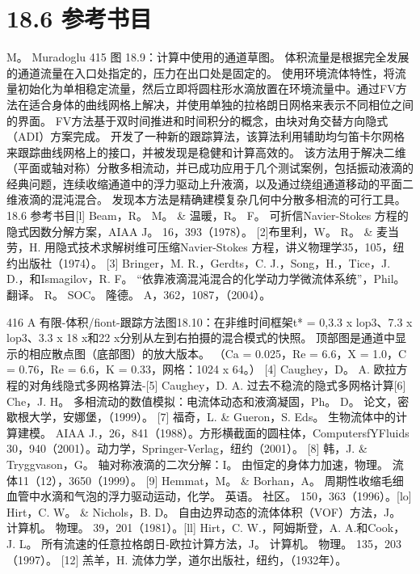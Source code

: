 \documentclass[UTF8,11pt,a4paper,openany,fontset=fandol]{ctexbook}
\begin{document}
\section{18.6 参考书目}
M。 Muradoglu 415 图 18.9：计算中使用的通道草图。 体积流量是根据完全发展的通道流量在入口处指定的，压力在出口处是固定的。 使用环境流体特性，将流量初始化为单相稳定流量，然后立即将圆柱形水滴放置在环境流量中。通过FV方法在适合身体的曲线网格上解决，并使用单独的拉格朗日网格来表示不同相位之间的界面。 FV方法基于双时间推进和时间积分的概念，由块对角交替方向隐式（ADI）方案完成。 开发了一种新的跟踪算法，该算法利用辅助均匀笛卡尔网格来跟踪曲线网格上的接口，并被发现是稳健和计算高效的。 该方法用于解决二维（平面或轴对称）分散多相流动，并已成功应用于几个测试案例，包括振动液滴的经典问题，连续收缩通道中的浮力驱动上升液滴，以及通过绕组通道移动的平面二维液滴的混沌混合。 发现本方法是精确建模复杂几何中分散多相流的可行工具。 18.6 参考书目[l] Beam，R。 M。 \& 温暖，R。 F。 可折信Navier-Stokes 方程的隐式因数分解方案，AIAA J。 16，393（1978）。 [2]布里利，W。 R。 \& 麦当劳，H. 用隐式技术求解树维可压缩Navier-Stokes 方程，讲义物理学35，105，纽约出版社（1974）。 [3] Bringer，M. R.，Gerdts，C. J.，Song，H.，Tice，J. D.，和Ismagilov，R. F。 “依靠液滴混沌混合的化学动力学微流体系统”，Phil。 翻译。 R。 SOC。 隆德。 A，362，1087，（2004）。

416 A 有限-体积/fiont-跟踪方法图18.10：在非维时间框架t* = 0,3.3 x lop3、7.3 x lop3、3.3 x 18 x和22 x分别从左到右拍摄的混合模式的快照。 顶部图是通道中显示的相应散点图（底部图）的放大版本。 （Ca = 0.025，Re = 6.6，X = 1.0，C = 0.76，Re = 6.6，K = 0.33，网格：1024 x 64。） [4] Caughey，D。 A. 欧拉方程的对角线隐式多网格算法-[5] Caughey，D. A. 过去不稳流的隐式多网格计算[6] Che，J. H。 多相流动的数值模拟：电流体动态和液滴凝固，Ph。 D。 论文，密歇根大学，安娜堡，（1999）。 [7] 福奇，L. \& Gueron，S. Eds。 生物流体中的计算建模。 AIAA J.，26，841（1988）。方形横截面的圆柱体，ComputersfYFluids 30，940（2001）。动力学，Springer-Verlag，纽约（2001）。 [8] 韩，J. \& Tryggvason，G。 轴对称液滴的二次分解：I。 由恒定的身体力加速，物理。 流体11（12），3650（1999）。 [9] Hemmat，M。 \& Borhan，A。 周期性收缩毛细血管中水滴和气泡的浮力驱动运动，化学。 英语。 社区。 150，363（1996）。[lo] Hirt，C. W。 \& Nichols，B. D。 自由边界动态的流体体积（VOF）方法，J。 计算机。 物理。 39，201（1981）。[ll] Hirt，C. W.，阿姆斯登，A. A.和Cook，J. L。 所有流速的任意拉格朗日-欧拉计算方法，J。 计算机。 物理。 135，203（1997）。 [12] 羔羊，H. 流体力学，道尔出版社，纽约，（1932年）。
\end{document}
